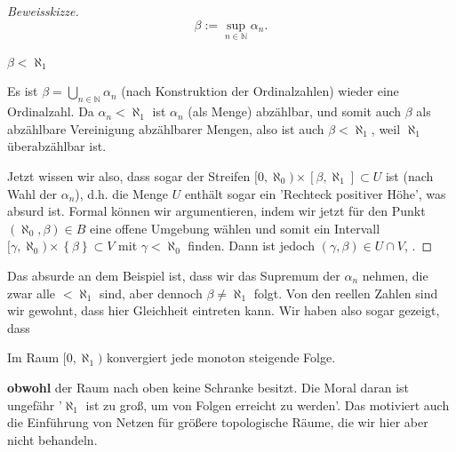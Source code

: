 \begin{example*}
\begin{proof}[Beweisskizze]
        \[
        β := \sup_{n\in \mathbb{N}} α_n
        .\] 
        \begin{claim}
            $β<\aleph_1$
        \end{claim}
        \begin{subproof}
            Es ist $β = \bigcup_{n\in \mathbb{N}} α_n$ (nach Konstruktion der Ordinalzahlen) wieder eine Ordinalzahl. Da $α_n < \aleph_1$ ist  $α_n$ (als Menge) abzählbar, und somit auch  $β$ als abzählbare Vereinigung abzählbarer Mengen, also ist auch  $β<\aleph_1$, weil  $\aleph_1$ überabzählbar ist.    
        \end{subproof}
        Jetzt wissen wir also, dass sogar der Streifen $[0,\aleph_0) \times [β,\aleph_1]\subset U$ ist (nach Wahl der $α_n$), d.h. die Menge  $U$ enthält sogar ein 'Rechteck positiver Höhe', was absurd ist. Formal können wir argumentieren, indem wir jetzt für den Punkt $(\aleph_0, β)\in B$ eine offene Umgebung wählen und somit ein Intervall $[\gamma, \aleph_0) \times \left \{β\right\} \subset V$ mit $\gamma <\aleph_0$ finden. Dann ist jedoch $(\gamma, \beta)\in U\cap V$, \contra.
    \end{proof}
        Das absurde an dem Beispiel ist, dass wir das Supremum der $α_n$ nehmen, die zwar alle  $<\aleph_1$ sind, aber dennoch  $β \neq \aleph_1$ folgt. Von den reellen Zahlen sind wir gewohnt, dass hier Gleichheit eintreten kann. Wir haben also sogar gezeigt, dass
        \begin{claim}
            Im Raum $[0,\aleph_1)$ konvergiert jede monoton steigende Folge.
        \end{claim}
        \noindent\textbf{obwohl} der Raum nach oben keine Schranke besitzt. Die Moral daran ist ungefähr '$\aleph_1$ ist zu groß, um von Folgen erreicht zu werden'. Das motiviert auch die Einführung von Netzen für größere topologische Räume, die wir hier aber nicht behandeln.
\end{example*}


